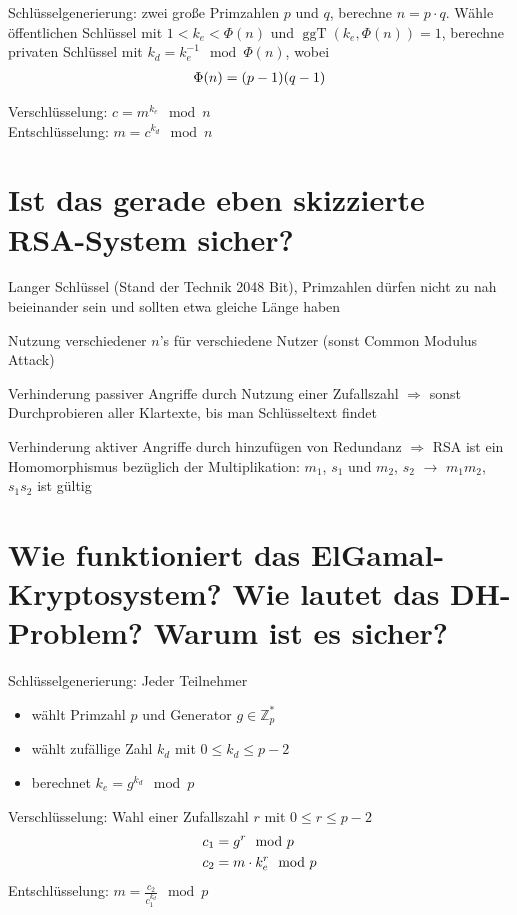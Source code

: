 \documentclass{article}
\DeclareMathOperator{\ggT}{ggT}
\begin{document}
	Schlüsselgenerierung: zwei große Primzahlen $p$ und $q$, berechne $n=p\cdot q$. Wähle öffentlichen Schlüssel mit $1<k_e<\Phi(n)$ und $\ggT(k_e,\Phi(n)) = 1$, berechne privaten Schlüssel mit $k_d = k_e^{-1}\mod \Phi(n)$, wobei
	\begin{align}
		\Phi(n) = (p-1)(q-1) \notag
	\end{align}

	Verschlüsselung: $c = m^{k_e}\mod n$ \\
	Entschlüsselung: $m = c^{k_d}\mod n$
	
	\section*{Ist das gerade eben skizzierte RSA-System sicher?}
	
	Langer Schlüssel (Stand der Technik 2048 Bit), Primzahlen dürfen nicht zu nah beieinander sein und sollten etwa gleiche Länge haben
	
	Nutzung verschiedener $n$'s für verschiedene Nutzer (sonst Common Modulus Attack)
	
	Verhinderung passiver Angriffe durch Nutzung einer Zufallszahl $\Rightarrow$ sonst Durchprobieren aller Klartexte, bis man Schlüsseltext findet
	
	Verhinderung aktiver Angriffe durch hinzufügen von Redundanz $\Rightarrow$ RSA ist ein Homomorphismus bezüglich der Multiplikation: $m_1$, $s_1$ und $m_2$, $s_2$ $\to$ $m_1m_2$, $s_1s_2$ ist gültig
	
	\section*{Wie funktioniert das ElGamal-Kryptosystem? Wie lautet das DH-Problem? Warum ist es sicher?}
	
	Schlüsselgenerierung: Jeder Teilnehmer
	\begin{itemize}
		\item wählt Primzahl $p$ und Generator $g\in\mathbb{Z}_p^\ast$
		\item wählt zufällige Zahl $k_d$ mit $0\le k_d\le p-2$
		\item berechnet $k_e = g^{k_d}\mod p$
	\end{itemize}

	Verschlüsselung: Wahl einer Zufallszahl $r$ mit $0\le r\le p-2$
	\begin{align}
		c_1 &= g^r \mod p \notag \\
		c_2 &= m\cdot k_e^r \mod p \notag
	\end{align}
	Entschlüsselung: $m = \frac{c_2}{c_1^{k_d}} \mod p$
	
\end{document}
